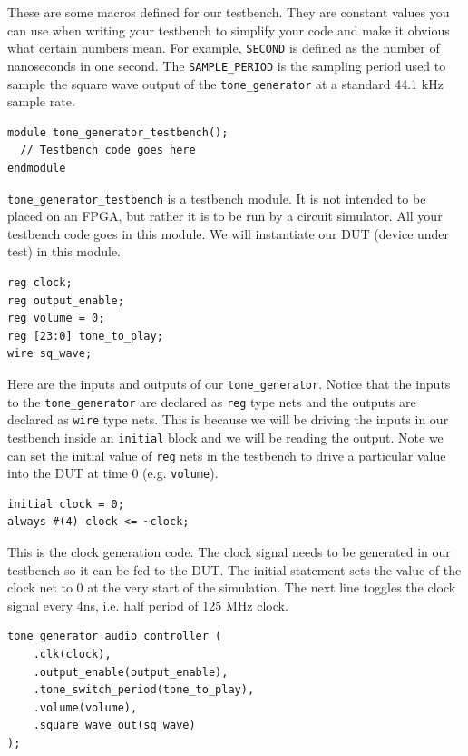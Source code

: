 \documentclass[11pt]{article}
\begin{document}
These are some macros defined for our testbench.
They are constant values you can use when writing your testbench to simplify your code and make it obvious what certain numbers mean.
For example, \verb|SECOND| is defined as the number of nanoseconds in one second.
The \verb|SAMPLE_PERIOD| is the sampling period used to sample the square wave output of the \verb|tone_generator| at a standard 44.1 kHz sample rate.

\begin{verbatim}
module tone_generator_testbench();
  // Testbench code goes here
endmodule
\end{verbatim}

\verb|tone_generator_testbench| is a testbench module.
It is not intended to be placed on an FPGA, but rather it is to be run by a circuit simulator.
All your testbench code goes in this module.
We will instantiate our DUT (device under test) in this module.

\begin{verbatim}
reg clock;
reg output_enable;
reg volume = 0;
reg [23:0] tone_to_play;
wire sq_wave;
\end{verbatim}

Here are the inputs and outputs of our \verb|tone_generator|.
Notice that the inputs to the \verb|tone_generator| are declared as \verb|reg| type nets and the outputs are declared as \verb|wire| type nets.
This is because we will be driving the inputs in our testbench inside an \verb|initial| block and we will be reading the output.
Note we can set the initial value of \verb|reg| nets in the testbench to drive a particular value into the DUT at time 0 (e.g. \verb|volume|).

\begin{verbatim}
initial clock = 0;
always #(4) clock <= ~clock;
\end{verbatim}

This is the clock generation code.
The clock signal needs to be generated in our testbench so it can be fed to the DUT.
The initial statement sets the value of the clock net to 0 at the very start of the simulation.
The next line toggles the clock signal every 4ns, i.e. half period of 125 MHz clock.

\begin{verbatim}
tone_generator audio_controller (
    .clk(clock),
    .output_enable(output_enable),
    .tone_switch_period(tone_to_play),
    .volume(volume),
    .square_wave_out(sq_wave)
);
\end{verbatim}
\end{document}
